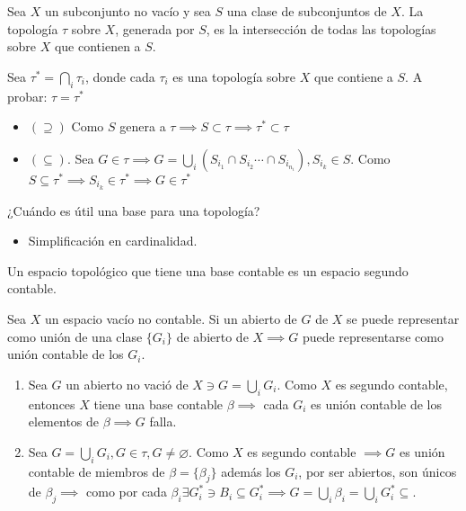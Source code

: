 \begin{teorema}
    Sea $X$ un subconjunto no vacío y sea $S$ una clase de subconjuntos de $X$. La topología $\tau$ sobre $X$, generada por $S$, es la intersección de todas las topologías sobre $X$ que contienen a $S$. 
    \begin{dem}
        Sea $\tau^*=\bigcap_i\tau_i$, donde cada $\tau_i$ es una topología sobre $X$ que contiene a $S$. A probar: $\tau=\tau^*$

        \begin{itemize}
            \item $(\supseteq)$ Como $S$ genera a $\tau\implies S\subset \tau\implies \tau^*\subset\tau $
            \item $(\subseteq)$. Sea $G\in\tau\implies G=\bigcup_i\left(S_{i_1}\cap S_{i_2}\cdots \cap S_{i_{n_i}}\right), S_{i_k}\in S$. Como $S\subseteq \tau^*\implies S_{i_k}\in\tau^*\implies G\in \tau^*$ 
        \end{itemize}
    \end{dem}
\end{teorema}
\begin{cajita}
    ¿Cuándo es útil una base para una topología?
    \begin{itemize}
        \item Simplificación en cardinalidad.
    \end{itemize}
\end{cajita}

\begin{definicion}
    Un espacio topológico que tiene una base contable es un espacio segundo contable. 
\end{definicion}

\begin{teorema}[de Lindelof]
    Sea $X$ un espacio vacío no contable. Si un abierto de $G$ de $X$ se puede representar como unión de una clase $\{G_i\}$ de abierto de $X\implies G$ puede representarse como unión contable de los $G_i$. 
    \begin{dem}
        \begin{enumerate}
            \item Sea $G$ un abierto no vació de $X\ni G=\bigcup_i G_i$. Como $X$ es segundo contable, entonces $X$ tiene una base contable $\beta\implies $ cada $G_i$ es unión contable de los elementos de $\beta\implies G$  falla. 
            \item Sea $G=\bigcup_i G_i,G\in\tau,G\neq \varnothing$. Como $X$ es segundo contable $\implies G$ es unión contable de miembros de $\beta=\{\beta_j\}$ además los $G_i$, por ser abiertos, son únicos de $\beta_j\implies$ como por cada $\beta_i\exists G_i^*\ni B_i\subseteq G_i^*\implies G=\bigcup_i \beta_i=\bigcup_i G_i^*\subseteq$. 
        \end{enumerate}
        
    \end{dem}
\end{teorema}